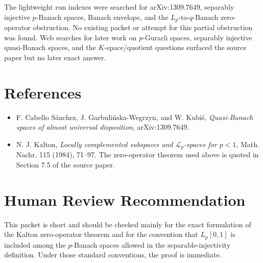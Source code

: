 \documentclass[11pt]{article}
\begin{document}
The lightweight run indexes were searched for arXiv:1309.7649, separably
injective \(p\)-Banach spaces, Banach envelope, and the \(L_p\)-to-\(q\)-Banach
zero-operator obstruction.  No existing packet or attempt for this partial
obstruction was found.  Web searches for later work on \(p\)-Gurari\u{\i}
spaces, separably injective quasi-Banach spaces, and the \(K\)-space/quotient
questions surfaced the source paper but no later exact answer.

\section*{References}

\begin{itemize}
\item F. Cabello S\'anchez, J. Garbuli\'nska-Wegrzyn, and W. Kubi\'s,
\emph{Quasi-Banach spaces of almost universal disposition},
arXiv:1309.7649.
\item N. J. Kalton, \emph{Locally complemented subspaces and
\(\mathcal L_p\)-spaces for \(p<1\)}, Math. Nachr. 115 (1984), 71--97.
The zero-operator theorem used above is quoted in Section 7.5 of the source
paper.
\end{itemize}

\section*{Human Review Recommendation}

This packet is short and should be checked mainly for the exact formulation of
the Kalton zero-operator theorem and for the convention that \(L_p[0,1]\) is
included among the \(p\)-Banach spaces allowed in the separable-injectivity
definition.  Under those standard conventions, the proof is immediate.
\end{document}
